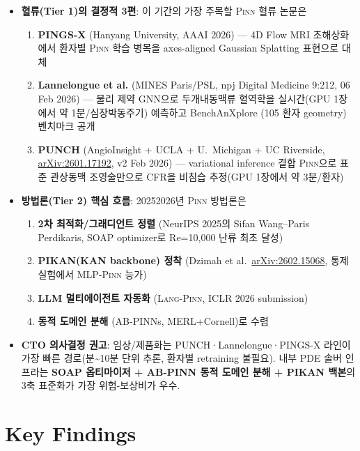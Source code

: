 \documentclass[11pt,a4paper,oneside]{report}
\newcommand{\pinn}{\textsc{Pinn}}
\newcommand{\langpinn}{\textsc{Lang-Pinn}}
\newcommand{\arxivid}[1]{\href{https://arxiv.org/abs/#1}{arXiv:#1}}
\begin{document}
\begin{itemize}
\item \textbf{혈류(Tier 1)의 결정적 3편}: 이 기간의 가장 주목할 \pinn{} 혈류 논문은
\begin{enumerate}
\item \textbf{PINGS-X} (Hanyang University, AAAI 2026) --- 4D Flow MRI 초해상화에서 환자별 \pinn{} 학습 병목을 axes-aligned Gaussian Splatting 표현으로 대체
\item \textbf{Lannelongue et al.} (MINES Paris/PSL, npj Digital Medicine 9:212, 06 Feb 2026) --- 물리 제약 GNN으로 두개내동맥류 혈역학을 실시간(GPU 1장에서 약 1분/심장박동주기) 예측하고 BenchAnXplore (105 환자 geometry) 벤치마크 공개
\item \textbf{PUNCH} (AngioInsight + UCLA + U.\ Michigan + UC Riverside, \arxivid{2601.17192}, v2 Feb 2026) --- variational inference 결합 \pinn{}으로 표준 관상동맥 조영술만으로 CFR을 비침습 추정(GPU 1장에서 약 3분/환자)
\end{enumerate}

\item \textbf{방법론(Tier 2) 핵심 흐름}: 2025\textendash 2026년 \pinn{} 방법론은
\begin{enumerate}
\item \textbf{2차 최적화/그래디언트 정렬} (NeurIPS 2025의 Sifan Wang--Paris Perdikaris, SOAP optimizer로 Re=10{,}000 난류 최초 달성)
\item \textbf{PIKAN(KAN backbone) 정착} (Dzimah et al.\ \arxivid{2602.15068}, 통제 실험에서 MLP-\pinn{} 능가)
\item \textbf{LLM 멀티에이전트 자동화} (\langpinn{}, ICLR 2026 submission)
\item \textbf{동적 도메인 분해} (AB-PINNs, MERL+Cornell)로 수렴
\end{enumerate}

\item \textbf{CTO 의사결정 권고}: 임상/제품화는 PUNCH·Lannelongue·PINGS-X 라인이 가장 빠른 경로(분\textasciitilde{}10분 단위 추론, 환자별 retraining 불필요). 내부 PDE 솔버 인프라는 \textbf{SOAP 옵티마이저 + AB-PINN 동적 도메인 분해 + PIKAN 백본}의 3축 표준화가 가장 위험-보상비가 우수.
\end{itemize}

\section{Key Findings}
\end{document}
